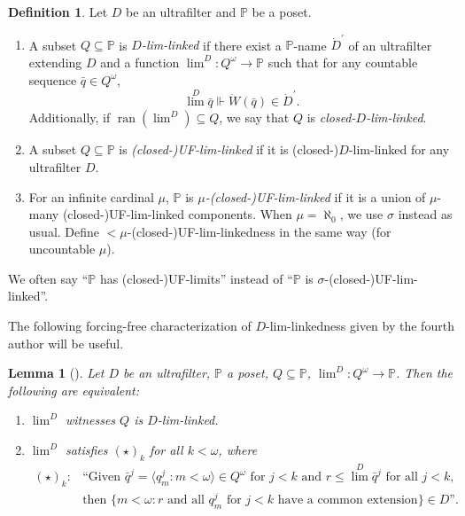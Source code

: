 \documentclass[a4paper,12pt]{amsart}
\newtheorem{lem}[thm]{Lemma}
\theoremstyle{definition}
\newtheorem{dfn}[thm]{Definition}
\numberwithin{thm}{section}
\numberwithin{equation}{section}
\newcommand{\p}{\mathbb{P}}
\DeclareMathOperator{\ran}{ran}
\begin{document}
    \begin{dfn}\label{dfn_UF_linked} 
    	Let $D$ be an ultrafilter and $\p$ be a poset.
    	\begin{enumerate}
    		\item A subset $Q\subseteq \p$ is \emph{$D$-lim-linked} if there exist a $\p$-name $\dot{D}^\prime$ of an ultrafilter extending $D$ and a function $\lim^D\colon Q^\omega\to\p$ such that for any countable sequence $\bar{q}\in Q^\omega$, 
    		\begin{equation}
    			\textstyle{\lim^D\bar{q}} \Vdash \dot{W}(\bar{q})\in \dot{D}^\prime.
    		\end{equation}
            Additionally, if $\ran(\lim^D)\subseteq Q$, we say that $Q$ is \emph{closed-$D$-lim-linked}.
            \item A subset $Q\subseteq \p$ is \emph{(closed-)UF-lim-linked} if it is (closed-)$D$-lim-linked for any ultrafilter $D$.
            \item For an infinite cardinal $\mu$, $\p$ is \emph{$\mu$-(closed-)UF-lim-linked} if it is a union of $\mu$-many (closed-)UF-lim-linked components. When $\mu=\aleph_0$, we use $\sigma$ instead as usual. Define $<\mu$-(closed-)UF-lim-linkedness in the same way (for uncountable $\mu$).  
    	\end{enumerate}
        We often say ``$\p$ has (closed-)UF-limits'' instead of ``$\p$ is $\sigma$-(closed-)UF-lim-linked''.
    \end{dfn}
    
    The following forcing-free characterization of $D$-lim-linkedness given by the fourth author will be useful.
    
    \begin{lem}[{\cite[Lem 3.28]{Yam25}}]\label{lem:chara_UF_linked}
    	Let $D$ be an ultrafilter, $\p$ a poset, $Q\subseteq\p$, $\lim^D\colon Q^\omega\to\p$. Then the following are equivalent:
    	\begin{enumerate}
    		\item $\lim^D$ witnesses $Q$ is $D$-lim-linked.\label{item_lim_1}
    		\item $\lim^D$ satisfies $(\star)_k$ for all $k<\omega$, where \label{item_lim_2}
    		\begin{align*}
    			(\star)_k:& \text{``Given }\bar{q}^j=\langle q_m^j:m<\omega\rangle\in Q^\omega\text{ for }j<k\text{ and }r\leq\textstyle{\lim^D}\bar{q}^j\text{ for all }j<k,\\
    			&\text{then }\{m<\omega:r \text{ and all }q_m^j \text{ for } j<k \text{ have a common extension}\}\in D\text{''}.
    		\end{align*}
    	\end{enumerate}
    \end{lem}
    
\end{document}
